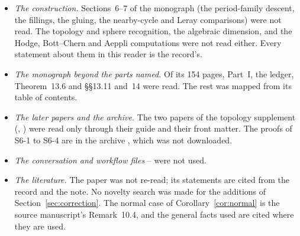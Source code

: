 \begin{itemize}
\item \emph{The construction.} Sections~6--7 of the monograph (the period-family descent, the fillings, the gluing, the nearby-cycle and Leray comparisons) were not read. The topology and sphere recognition, the algebraic dimension, and the Hodge, Bott--Chern and Aeppli computations were not read either. Every statement about them in this reader is the record's.
\item \emph{The monograph beyond the parts named.} Of its 154 pages, Part~I, the ledger, Theorem~13.6 and §§13.11 and~14 were read. The rest was mapped from its table of contents.
\item \emph{The later papers and the archive.} The two papers of the topology supplement (, ) were read only through their guide and their front matter. The proofs of S6-1 to S6-4 are in the archive , which was not downloaded.
\item \emph{The conversation and workflow files} -- were not used.
\item \emph{The literature.} The paper \cite{CDP20} was not re-read; its statements are cited from the record and the note. No novelty search was made for the additions of Section~\ref{sec:correction}. The normal case of Corollary~\ref{cor:normal} is the source manuscript's Remark~10.4, and the general facts used are cited where they are used.
\end{itemize}
